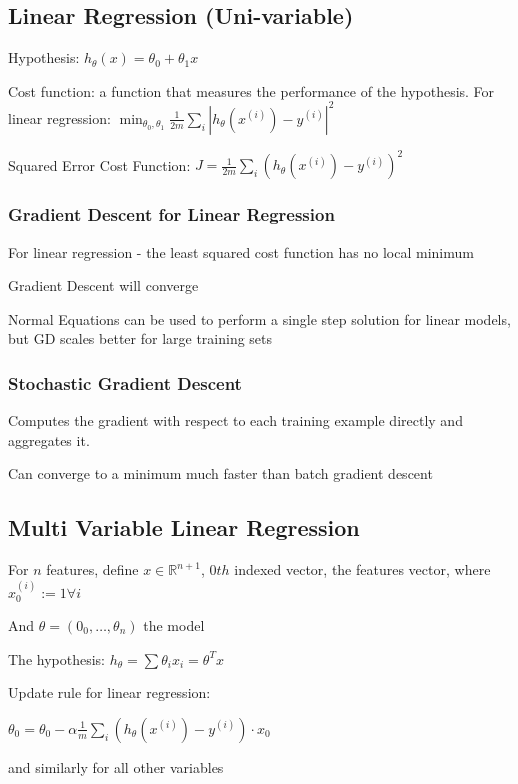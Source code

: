 \subsection{ Linear Regression (Uni-variable)}

Hypothesis: $h_\theta(x) = \theta_0 + \theta_1x$ 

Cost function: a function that measures the performance of the hypothesis. 
For linear regression: $\min_{\theta_0,\theta_1} \frac{1}{2m}\sum_i| h_\theta(x^{(i)})-y^{(i)} |^2 $

Squared Error Cost Function: $J = \frac{1}{2m}\sum_i( h_\theta(x^{(i)})-y^{(i)} )^2 $ 

\subsubsection{Gradient Descent for Linear Regression}

For linear regression - the least squared cost function has no local minimum

Gradient Descent will converge 

Normal Equations can be used to perform a single step solution for linear models, but GD scales better for large training sets

\subsubsection{Stochastic Gradient Descent}

Computes the gradient with respect to each training example directly and aggregates it. 

Can converge to a minimum much faster than batch gradient descent 

\subsection{Multi Variable Linear Regression}

For $n$ features, define $ x\in\mathbb{R}^{n+1}$, $0th$ indexed vector,  the features vector, where $x_0^{(i)} := 1 \forall i$  

And $\theta = (0_0,\dots,\theta_n)$  the model

The hypothesis: $h_{\theta} = \sum \theta_i x_i = \theta^T x$  

Update rule for linear regression:

$\theta_0 = \theta_0 -\alpha\frac{1}{m}\sum_i (h_\theta(x^{(i)})-y^{(i)})\cdot x_0$

and similarly for all other variables


